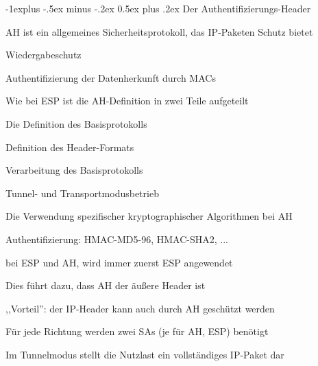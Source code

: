 \documentclass[a4paper]{article}
\makeatletter
\renewcommand{\subsection}{\@startsection{subsection}{2}{0mm}%
 {-1explus -.5ex minus -.2ex}%
 {0.5ex plus .2ex}%
 {\normalfont\normalsize\bfseries}}
\makeatother
\begin{document}
\begin{multicols}{3}
      \subsection{Der Authentifizierungs-Header}
      \begin{itemize*}
            \item AH ist ein allgemeines Sicherheitsprotokoll, das IP-Paketen Schutz bietet
            \begin{itemize*}
                  \item Wiedergabeschutz
                  \item Authentifizierung der Datenherkunft durch MACs
            \end{itemize*}
            \item Wie bei ESP ist die AH-Definition in zwei Teile aufgeteilt
            \begin{itemize*}
                  \item Die Definition des Basisprotokolls
                  \begin{itemize*}
                        \item Definition des Header-Formats
                        \item Verarbeitung des Basisprotokolls
                        \item Tunnel- und Transportmodusbetrieb
                  \end{itemize*}
                  \item Die Verwendung spezifischer kryptographischer Algorithmen bei AH
                  \begin{itemize*}
                        \item Authentifizierung: HMAC-MD5-96, HMAC-SHA2, ...
                        \item bei ESP und AH, wird immer zuerst ESP angewendet
                        \item Dies führt dazu, dass AH der äußere Header ist
                  \end{itemize*}
                  \item ,,Vorteil'': der IP-Header kann auch durch AH geschützt werden
                  \item Für jede Richtung werden zwei SAs (je für AH, ESP) benötigt
            \end{itemize*}
            \item Im Tunnelmodus stellt die Nutzlast ein vollständiges IP-Paket dar

\end{itemize*}
\end{multicols}
\end{document}
